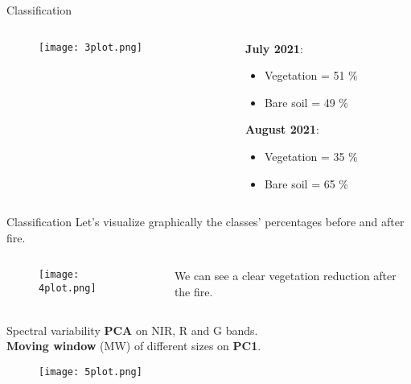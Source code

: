 \documentclass{beamer}
\begin{document}
\begin{frame}{Classification}
\begin{columns}
    \begin{column}{0.65\textwidth}
    \begin{figure}
           \centering
           \texttt{[image: 3plot.png]}
       \end{figure}   
    \end{column}

    \begin{column}{0.5\textwidth}
    \textbf{July 2021}:
        \begin{itemize}
            \item Vegetation = 51 \%
            \item Bare soil = 49 \%
        \end{itemize}
        \bigskip
        \bigskip
        \bigskip
        \textbf{August 2021}:
        \begin{itemize}
            \item Vegetation = 35 \%
            \item Bare soil = 65 \%
        \end{itemize}
    \end{column}
\end{columns}    
\end{frame}

\begin{frame}{Classification}
\centering
Let's visualize graphically the classes' percentages before and after fire. 
\begin{columns}
    \begin{column}{0.65\textwidth}
    \begin{figure}
        \centering
        \texttt{[image: 4plot.png]} 
    \end{figure}
    \end{column}

    \begin{column}{0.5\textwidth}
        We can see a clear vegetation reduction after the fire. 
    \end{column}
\end{columns}     
\end{frame}

\begin{frame}{Spectral variability}
\centering
\textbf{PCA} on NIR, R and G bands.\\
\textbf{Moving window} (MW) of different sizes on \textbf{PC1}.
\begin{figure}
      \centering
      \texttt{[image: 5plot.png]}
  \end{figure}      
\end{frame}
\end{document}
